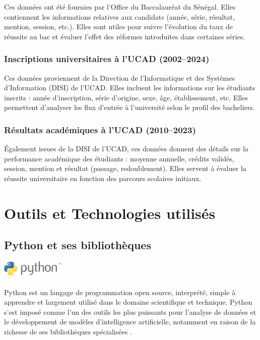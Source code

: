 Ces données ont été fournies par l’Office du Baccalauréat du Sénégal. 
Elles contiennent les informations relatives aux candidats (année, série, résultat, mention, session, etc.). 
Elles sont utiles pour suivre l’évolution du taux de réussite au bac et évaluer l’effet des réformes introduites dans certaines séries.

\subsubsection{Inscriptions universitaires à l’UCAD (2002–2024)}

Ces données proviennent de la Direction de l’Informatique et des Systèmes d’Information (DISI) de l’UCAD. 
Elles incluent les informations sur les étudiants inscrits : année d’inscription, série d’origine, sexe, âge, établissement, etc. 
Elles permettent d’analyser les flux d’entrée à l’université selon le profil des bacheliers.

\subsubsection{Résultats académiques à l’UCAD (2010–2023)}

Également issues de la DISI de l’UCAD, ces données donnent des détails sur la performance académique des étudiants :
moyenne annuelle, crédits validés, session, mention et résultat (passage, redoublement). 
Elles servent à évaluer la réussite universitaire en fonction des parcours scolaires initiaux.

\newpage
\section{Outils et Technologies utilisés}

\subsection{Python et ses bibliothèques }

\includegraphics[width=3cm]{images/python.png}

Python est un langage de programmation open source, interprété, 
simple à apprendre et largement utilisé dans le domaine scientifique et technique.
Python s’est imposé comme l’un des outils les plus puissants pour l’analyse de données et le développement de modèles d’intelligence artificielle, 
notamment en raison de la richesse de ses bibliothèques spécialisées \cite{python}.

